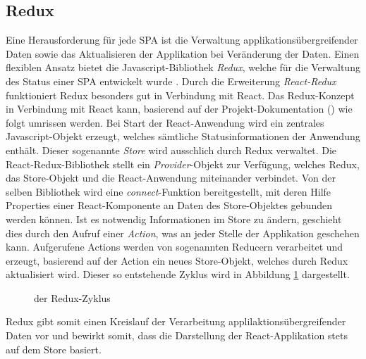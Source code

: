 \subsection{Redux}
Eine Herausforderung für jede SPA ist die Verwaltung applikationsübergreifender Daten sowie das Aktualisieren der Applikation bei Veränderung der Daten.
Einen flexiblen Ansatz bietet die Javascript-Bibliothek \emph{Redux}, welche für die Verwaltung des Status einer SPA entwickelt wurde \autocite[vgl.]{Redux:Introduction}. 
Durch die Erweiterung \emph{React-Redux} funktioniert Redux besonders gut in Verbindung mit React.
Das Redux-Konzept in Verbindung mit React kann, basierend auf der Projekt-Dokumentation (\cite{ReactRedux:QuickStart}) wie folgt umrissen werden. Bei Start der React-Anwendung wird ein zentrales Javascript-Objekt erzeugt, welches sämtliche Statusinformationen der Anwendung enthält. Dieser sogenannte \emph{Store} wird ausschlich durch Redux verwaltet. Die React-Redux-Bibliothek stellt ein \emph{Provider}-Objekt zur Verfügung, welches Redux, das Store-Objekt und die React-Anwendung miteinander verbindet. Von der selben Bibliothek wird eine \emph{connect}-Funktion bereitgestellt, mit deren Hilfe Properties einer React-Komponente an Daten des Store-Objektes gebunden werden können. Ist es notwendig Informationen im Store zu ändern, geschieht dies durch den Aufruf einer \emph{Action}, was an jeder Stelle der Applikation geschehen kann. Aufgerufene Actions werden von sogenannten Reducern verarbeitet und erzeugt, basierend auf der Action ein neues Store-Objekt, welches durch Redux aktualisiert wird. Dieser so entstehende Zyklus wird in Abbildung \ref{figure:ReduxCycle} dargestellt.
\begin{figure}[H]
\centering
{}
\caption[Redux-Zyklus]{der Redux-Zyklus}
\label{figure:ReduxCycle}
\end{figure}
Redux gibt somit einen Kreislauf der Verarbeitung applilaktionsübergreifender Daten vor und bewirkt somit, dass die Darstellung der React-Applikation stets auf dem Store basiert.


